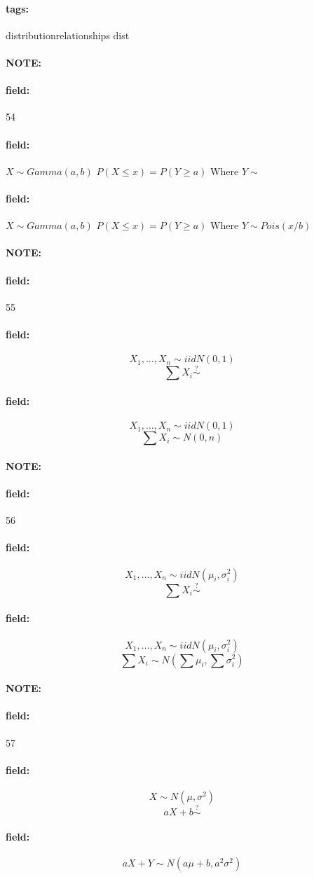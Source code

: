 \documentclass[12pt]{article}
\newenvironment{note}{\paragraph{NOTE:}}{}
\newenvironment{field}{\paragraph{field:}}{}
\newcommand*{\tags}[1]{\paragraph{tags: }#1}
\begin{document}
\tags{distributionrelationships dist}

\begin{note}
  \begin{field}
    \tiny 54
  \end{field}
  \begin{field}
    $X \sim Gamma(a,b)$
    $P(X \leq x) = P(Y \geq a)$ Where $Y \sim $
  \end{field}
  \begin{field}
    $X \sim Gamma(a,b)$
    $P(X \leq x) = P(Y \geq a)$
    Where $Y \sim Pois (x/b)$
  \end{field}
\end{note}


\begin{note}
  \begin{field}
    \tiny 55
  \end{field}
  \begin{field}
    $$X_1, \ldots, X_n \sim iid N(0,1)$$
    $$ \sum X_i \overset{?}{\sim}$$
  \end{field}
  \begin{field}
    $$X_1, \ldots, X_n \sim iid N(0,1)$$
    $$ \sum X_i \sim N(0,n)$$
  \end{field}
\end{note}

\begin{note}
  \begin{field}
    \tiny 56
  \end{field}
  \begin{field}
    $$X_1, \ldots, X_n \sim iid N(\mu_i,\sigma_i^2)$$
    $$ \sum X_i \overset{?}{\sim}$$
  \end{field}
  \begin{field}
    $$X_1, \ldots, X_n \sim iid N(\mu_i,\sigma_i^2)$$
    $$ \sum X_i \sim N(\sum \mu_i,\sum \sigma^2_i)$$
  \end{field}
\end{note}

\begin{note}
  \begin{field}
    \tiny 57
  \end{field}
  \begin{field}
    $$X  \sim N(\mu,\sigma^2)$$
    $$ aX + b \overset{?}{\sim}$$
  \end{field}
  \begin{field}
    $$ aX + Y \sim N(a\mu + b, a^2\sigma^2)$$
  \end{field}
\end{note}
\end{document}
